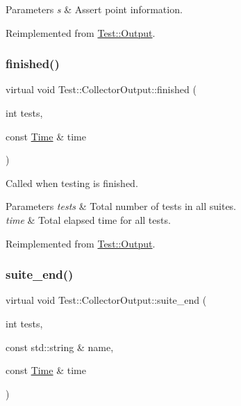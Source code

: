\begin{DoxyParams}{Parameters}
{\em s} & Assert point information. \\
\hline
\end{DoxyParams}


Reimplemented from \mbox{\hyperlink{class_test_1_1_output_a48c31f0baa7627d81939be840c9a7f65}{Test\+::\+Output}}.

\mbox{\label{class_test_1_1_collector_output_ad1a7502a31c58d93f0d88d7a679ab24d}} 
\subsubsection{\texorpdfstring{finished()}{finished()}}
{\footnotesize\ttfamily virtual void Test\+::\+Collector\+Output\+::finished (\begin{DoxyParamCaption}\item[{int}]{tests,  }\item[{const \mbox{\hyperlink{class_test_1_1_time}{Time}} \&}]{time }\end{DoxyParamCaption})\hspace{0.3cm}{\ttfamily [virtual]}}

Called when testing is finished.


\begin{DoxyParams}{Parameters}
{\em tests} & Total number of tests in all suites. \\
\hline
{\em time} & Total elapsed time for all tests. \\
\hline
\end{DoxyParams}


Reimplemented from \mbox{\hyperlink{class_test_1_1_output_aeff8af8326a8c54a38199f76837f860a}{Test\+::\+Output}}.

\mbox{\label{class_test_1_1_collector_output_a50c041adf1de3e296b50b1611e55a407}} 
\subsubsection{\texorpdfstring{suite\+\_\+end()}{suite\_end()}}
{\footnotesize\ttfamily virtual void Test\+::\+Collector\+Output\+::suite\+\_\+end (\begin{DoxyParamCaption}\item[{int}]{tests,  }\item[{const std\+::string \&}]{name,  }\item[{const \mbox{\hyperlink{class_test_1_1_time}{Time}} \&}]{time }\end{DoxyParamCaption})\hspace{0.3cm}{\ttfamily [virtual]}}

